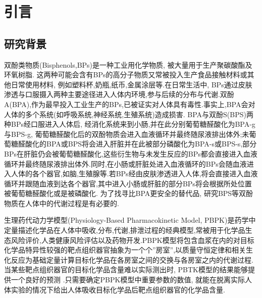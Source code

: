 \documentclass[a4paper,punct=banjiao,twoside]{ctexrep}
\theoremstyle{plain}
\theoremstyle{definition}
\theoremstyle{remark}
\begin{document}
\chapter{引言}

\section{研究背景} 
双酚类物质(Bisphenols,BPs)是一种工业用化学物质, 被大量用于生产聚碳酸酯及环氧树脂\cite{3}. 这两种可能会含有BPs的高分子物质又常被投入生产食品接触材料或其他日常使用材料, 例如塑料杯,奶瓶,纸币,金属涂层等\cite{4}.在日常生活中, BPs通过皮肤渗透与口服摄入两种主要途径进入人体内环境,参与后续的分布与代谢.双酚A(BPA),作为最早投入工业生产的BPs,已被证实对人体具有毒性\cite{2}.事实上,BPA会对人体的多个系统(如呼吸系统,神经系统,生殖系统)造成损害\cite{5}.
BPA与双酚S(BPS)两种BPs经口服进入人体后, 经消化系统来到小肠,并在此分别葡萄糖醛酸化为BPA-g与BPS-g, 葡萄糖醛酸化后的双酚物质会进入血液循环并最终随尿液排出体外;未葡萄糖醛酸化的BPA或BPS将会进入肝脏并在此被部分磷酸化为BPA-s或BPS-s,部分BPs在肝脏仍会被葡萄糖醛酸化,这些衍生物与未发生反应的BPs都会直接进入血液循环并最终随尿液排出体外\cite{2,1}.同时,在小肠或肝脏处进入血液循环的BPs会随血液进入人体的各个器官,如脑,生殖腺等.若BPs经由皮肤渗透进入人体,将会直接进入血液循环并跟随血液到达各个器官,其中进入小肠或肝脏的部分BPs将会根据所处位置被葡萄糖醛酸化或是被磷酸化.
为了找寻比BPA更安全的替代品, 研究BPS等双酚物质在人体中的代谢过程是有必要的\cite{6}.

生理药代动力学模型(Physiology-Based Pharmacokinetic Model, PBPK)是药学中定量描述化学品在人体中吸收,分布,代谢,排泄过程的经典模型,常被用于化学品生态风险评价,人类健康风险评估以及药物开发\cite{7}.PBPK模型将包含血浆在内的对目标化学品特异性较强的靶点组织器官抽象为一个个”房室”,以质量守恒定律和相关生化反应为基础定量计算目标化学品在各房室之间的交换与各房室之内的代谢过程\cite{8}.当某些靶点组织器官的目标化学品含量难以实际测出时, PBTK模型的结果能够提供一个良好的预测 \cite{7}.只需要确定PBPK模型中重要参数的数值, 就能在脱离实际人体实验的情况下给出人体吸收目标化学品后靶点组织器官的化学品含量.
\end{document}

